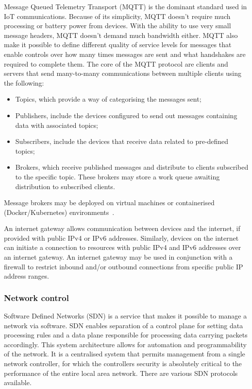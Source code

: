 \documentclass[11pt, oneside]{book}   	%
\begin{document}
Message Queued Telemetry Transport (MQTT) is the dominant standard used in IoT communications.
Because of its simplicity, MQTT doesn’t require much processing or battery power from devices.
With the ability to use very small message headers, MQTT doesn’t demand much bandwidth either.
MQTT also make it possible to define different quality of service levels for messages that enable controls over how many times messages are sent and what handshakes are required to complete them.
The core of the MQTT protocol are clients and servers that send many-to-many communications between multiple clients using the following:
\begin{itemize}
	\item Topics, which provide a way of categorising the messages sent; 
	\item Publishers, include the devices configured to send out messages containing data with associated topics;
	\item Subscribers, include the devices that receive data related to pre-defined topics;
	\item Brokers, which receive published messages and distribute to clients subscribed to the specific topic. These brokers may store a work queue awaiting distribution to subscribed clients.
\end{itemize}
Message brokers may be deployed on virtual machines or containerised (Docker/Kubernetes) environments~\cite{mqtt}.\

An internet gateway allows communication between devices and the internet, if provided with public IPv4 or IPv6 addresses.
Similarly, devices on the internet can initiate a connection to resources with public IPv4 and IPv6 addresses over an internet gateway.
An internet gateway may be used in conjunction with a firewall to restrict inbound and/or outbound connections from specific public IP address ranges.\

\subsubsection{Network control}
Software Defined Networks (SDN) is a service that makes it possible to manage a network via software.
SDN enables separation of a control plane for setting data processing rules and a data plane responsible for processing data carrying packets accordingly.
This system architecture allows for automation and programmability of the network.
It is a centralised system that permits management from a single network controller, for which the controllers security is absolutely critical to the performance of the entire local area network.
There are various SDN protocols available.\
\end{document}

